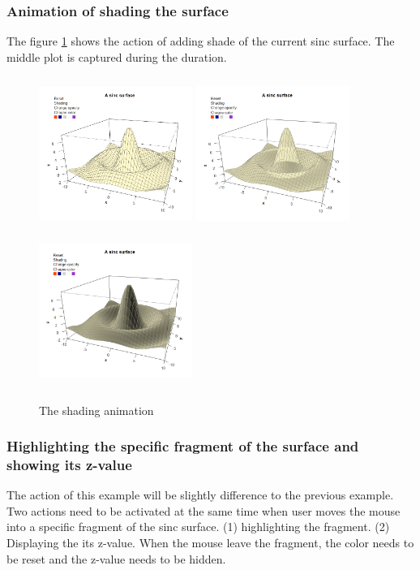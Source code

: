 \documentclass{report}
\begin{document}
\subsubsection*{Animation of shading the surface}
The figure \ref{Example_6.3.3} shows the action of adding shade of the current sinc surface. The middle plot is captured during the duration.
\begin{figure}[h]
	\begin{center}
		\includegraphics[height = 5cm, width = 5cm]{figure/svg/origin_1.PNG}
		\includegraphics[height = 5cm, width = 5cm]{figure/svg/Shade_2.PNG}
		\includegraphics[height = 5cm, width = 5cm]{figure/svg/Shade_3.PNG}
		\caption{The shading animation}
		\label{Example_6.3.3}
	\end{center}
\end{figure}

\subsubsection*{Highlighting the specific fragment of the surface and showing its z-value}
The action of this example will be slightly difference to the previous example. Two actions need to be activated at the same time when user moves the mouse into a specific fragment of the sinc surface. (1) highlighting the fragment. (2) Displaying the its z-value. When the mouse leave the fragment, the color needs to be reset and the z-value needs to be hidden.\\
\end{document}
